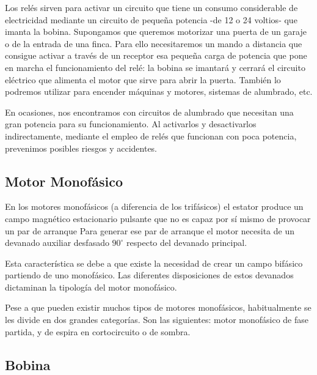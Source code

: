 Los relés sirven para activar un circuito que tiene un consumo considerable de electricidad mediante un circuito de pequeña potencia -de 12 o 24 voltios- que imanta la bobina. Supongamos que queremos motorizar una puerta de un garaje o de la entrada de una finca. Para ello necesitaremos un mando a distancia que consigue activar a través de un receptor esa pequeña carga de potencia que pone en marcha el funcionamiento del relé: la bobina se imantará y cerrará el circuito eléctrico que alimenta el motor que sirve para abrir la puerta. También lo podremos utilizar para encender máquinas y motores, sistemas de alumbrado, etc.

En ocasiones, nos encontramos con circuitos de alumbrado que necesitan una gran potencia para su funcionamiento. Al activarlos y desactivarlos indirectamente, mediante el empleo de relés que funcionan con poca potencia, prevenimos posibles riesgos y accidentes.



\subsection{Motor Monofásico}

En los motores monofásicos (a diferencia de los trifásicos) el estator produce un campo magnético estacionario pulsante  que no es capaz por sí mismo de provocar un par de arranque Para generar ese par de arranque  el motor necesita de un devanado auxiliar desfasado $90^{\circ}$ respecto del devanado principal.

Esta característica se debe a que existe la necesidad de crear un campo bifásico partiendo de uno monofásico. Las diferentes disposiciones de estos devanados dictaminan la tipología del motor monofásico.

Pese a que pueden existir muchos tipos de motores monofásicos, habitualmente se les divide en dos grandes categorías. Son las siguientes: motor monofásico de fase partida, y de espira en cortocircuito o de sombra.


\subsection{Bobina}

